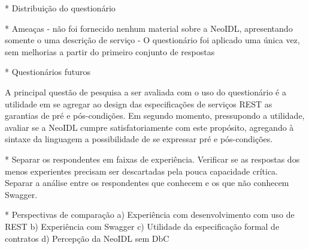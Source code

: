 * Distribuição do questionário

% 

* Ameaças
- não foi fornecido nenhum material sobre a NeoIDL, apresentando somente o uma
descrição de serviço
- O questionário foi aplicado uma única vez, sem melhorias a partir do primeiro
conjunto de respostas




* Questionários futuros

A principal questão de pesquisa a ser avaliada com o uso do questionário é a utilidade em se agregar ao design das especificações de serviços REST as garantias de pré e
pós-condições. Em segundo momento, pressupondo a utilidade, avaliar se a NeoIDL
cumpre satisfatoriamente com este propósito, agregando à sintaxe da linguagem
a possibilidade de se expressar pré e pós-condições.

* Separar os respondentes em faixas de experiência. Verificar se as respostas
dos menos experientes precisam ser descartadas pela pouca capacidade crítica.
Separar a análise entre os respondentes que conhecem e os que não conhecem
Swagger.

* Perspectivas de comparação
a) Experiência com desenvolvimento com uso de REST
b) Experiência com Swagger
c) Utilidade da especificação formal de contratos
d) Percepção da NeoIDL sem DbC



